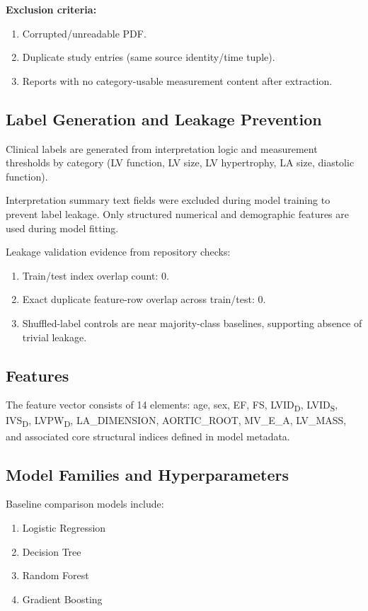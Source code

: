 \documentclass[10pt,twocolumn,letterpaper]{IEEEtran}
\begin{document}
\textbf{Exclusion criteria:}
\begin{enumerate}
\item Corrupted/unreadable PDF.
\item Duplicate study entries (same source identity/time tuple).
\item Reports with no category-usable measurement content after extraction.
\end{enumerate}

\subsection{Label Generation and Leakage Prevention}
Clinical labels are generated from interpretation logic and measurement thresholds by category (LV function, LV size, LV hypertrophy, LA size, diastolic function).

Interpretation summary text fields were excluded during model training to prevent label leakage. Only structured numerical and demographic features are used during model fitting.

Leakage validation evidence from repository checks:
\begin{enumerate}
\item Train/test index overlap count: 0.
\item Exact duplicate feature-row overlap across train/test: 0.
\item Shuffled-label controls are near majority-class baselines, supporting absence of trivial leakage.
\end{enumerate}

\subsection{Features}
The feature vector consists of 14 elements: age, sex, EF, FS, LVID\textsubscript{D}, LVID\textsubscript{S}, IVS\textsubscript{D}, LVPW\textsubscript{D}, LA\_DIMENSION, AORTIC\_ROOT, MV\_E\_A, LV\_MASS, and associated core structural indices defined in model metadata.

\subsection{Model Families and Hyperparameters}
Baseline comparison models include:
\begin{enumerate}
\item Logistic Regression
\item Decision Tree
\item Random Forest
\item Gradient Boosting
\end{enumerate}
\end{document}
